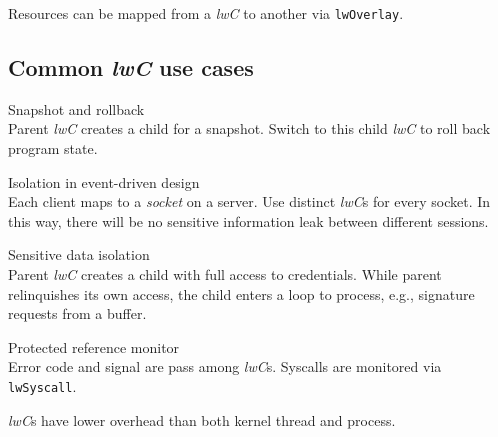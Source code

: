 Resources can be mapped from a \textit{lwC} to another via \verb|lwOverlay|.

\subsection{Common \textit{lwC} use cases}

\begin{example}
Snapshot and rollback \\

Parent \textit{lwC} creates a child for a snapshot. Switch to this child \textit{lwC} to roll back program state.
\end{example}

\begin{example}
Isolation in event-driven design \\

Each client maps to a \textit{socket} on a server. Use distinct \textit{lwC}s for every socket. In this way, there will be no sensitive information leak between different sessions.
\end{example}

\begin{example}
Sensitive data isolation \\

Parent \textit{lwC} creates a child with full access to credentials. While parent relinquishes its own access, the child enters a loop to process, e.g., signature requests from a buffer.
\end{example}

\begin{example}
Protected reference monitor \\

Error code and signal are pass among \textit{lwC}s. Syscalls are monitored via \verb|lwSyscall|.
\end{example}

\textit{lwC}s have lower overhead than both kernel thread and process.
